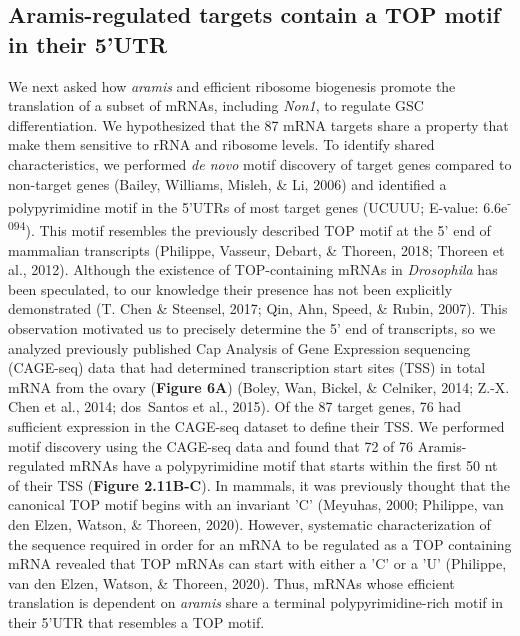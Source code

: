 \documentclass[12pt,oneside]{reedthesis}
\begin{document}
\hypertarget{aramis-regulated-targets-contain-a-top-motif-in-their-5utr}{%
\subsection{Aramis-regulated targets contain a TOP motif in their 5'UTR}\label{aramis-regulated-targets-contain-a-top-motif-in-their-5utr}}

We next asked how \emph{aramis} and efficient ribosome biogenesis promote the translation of a subset of mRNAs, including \emph{Non1}, to regulate GSC differentiation. We hypothesized that the 87 mRNA targets share a property that make them sensitive to rRNA and ribosome levels. To identify shared characteristics, we performed \emph{de novo} motif discovery of target genes compared to non-target genes (Bailey, Williams, Misleh, \& Li, 2006) and identified a polypyrimidine motif in the 5'UTRs of most target genes (UCUUU; E-value: 6.6e\textsuperscript{-094}). This motif resembles the previously described TOP motif at the 5' end of mammalian transcripts (Philippe, Vasseur, Debart, \& Thoreen, 2018; Thoreen et al., 2012). Although the existence of TOP-containing mRNAs in \emph{Drosophila} has been speculated, to our knowledge their presence has not been explicitly demonstrated (T. Chen \& Steensel, 2017; Qin, Ahn, Speed, \& Rubin, 2007). This observation motivated us to precisely determine the 5' end of transcripts, so we analyzed previously published Cap Analysis of Gene Expression sequencing (CAGE-seq) data that had determined transcription start sites (TSS) in total mRNA from the ovary (\textbf{Figure 6A}) (Boley, Wan, Bickel, \& Celniker, 2014; Z.-X. Chen et al., 2014; dos~Santos et al., 2015). Of the 87 target genes, 76 had sufficient expression in the CAGE-seq dataset to define their TSS. We performed motif discovery using the CAGE-seq data and found that 72 of 76 Aramis-regulated mRNAs have a polypyrimidine motif that starts within the first 50 nt of their TSS (\textbf{Figure 2.11B-C}). In mammals, it was previously thought that the canonical TOP motif begins with an invariant 'C' (Meyuhas, 2000; Philippe, van den Elzen, Watson, \& Thoreen, 2020). However, systematic characterization of the sequence required in order for an mRNA to be regulated as a TOP containing mRNA revealed that TOP mRNAs can start with either a 'C' or a 'U' (Philippe, van den Elzen, Watson, \& Thoreen, 2020). Thus, mRNAs whose efficient translation is dependent on \emph{aramis} share a terminal polypyrimidine-rich motif in their 5'UTR that resembles a TOP motif.
\end{document}
